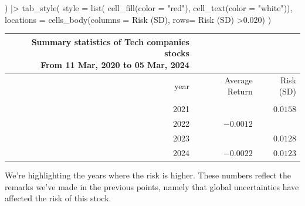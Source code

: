 \documentclass[
  12pt]{article}
\newenvironment{Shaded}{\begin{snugshade}}{\end{snugshade}}
\newcommand{\AttributeTok}[1]{\textcolor[rgb]{0.40,0.45,0.13}{#1}}
\newcommand{\FloatTok}[1]{\textcolor[rgb]{0.68,0.00,0.00}{#1}}
\newcommand{\FunctionTok}[1]{\textcolor[rgb]{0.28,0.35,0.67}{#1}}
\newcommand{\NormalTok}[1]{\textcolor[rgb]{0.00,0.23,0.31}{#1}}
\newcommand{\SpecialCharTok}[1]{\textcolor[rgb]{0.37,0.37,0.37}{#1}}
\newcommand{\StringTok}[1]{\textcolor[rgb]{0.13,0.47,0.30}{#1}}
\theoremstyle{definition}
\theoremstyle{remark}
\begin{document}
\begin{Shaded}
\begin{Highlighting}[]
\NormalTok{  ) }\SpecialCharTok{|\textgreater{}} 
  \FunctionTok{tab\_style}\NormalTok{(}
    \AttributeTok{style =} \FunctionTok{list}\NormalTok{(}
      \FunctionTok{cell\_fill}\NormalTok{(}\AttributeTok{color =} \StringTok{"red"}\NormalTok{), }
      \FunctionTok{cell\_text}\NormalTok{(}\AttributeTok{color =} \StringTok{"white"}\NormalTok{)), }
    \AttributeTok{locations =} 
      \FunctionTok{cells\_body}\NormalTok{(}\AttributeTok{columns =} \StringTok{\textasciigrave{}}\AttributeTok{Risk (SD)}\StringTok{\textasciigrave{}}\NormalTok{, }
                 \AttributeTok{rows=} \StringTok{\textasciigrave{}}\AttributeTok{Risk (SD)}\StringTok{\textasciigrave{}} \SpecialCharTok{\textgreater{}}\FloatTok{0.020}\NormalTok{)}
\NormalTok{  )}
\end{Highlighting}
\end{Shaded}

\begin{longtable*}{rrr}
\caption*{
{\large Summary statistics of Tech companies stocks} \\ 
{\small From 11 Mar, 2020 to 05 Mar, 2024}
} \\ 
\toprule
year & Average Return & Risk (SD) \\ 
\midrule{} &  &  \\ 
2021 &  & $0.0158$ \\ 
2022 & $-0.0012$ &  \\ 
2023 &  & $0.0128$ \\ 
2024 & $-0.0022$ & $0.0123$ \\ 
\bottomrule
\end{longtable*}

\begin{tcolorbox}[enhanced jigsaw, rightrule=.15mm, colbacktitle=quarto-callout-important-color!10!white, breakable, colback=white, titlerule=0mm, colframe=quarto-callout-important-color-frame, opacityback=0, bottomrule=.15mm, opacitybacktitle=0.6, left=2mm, title=\textcolor{quarto-callout-important-color}{\faExclamation}\hspace{0.5em}{Look at the years (again)!}, bottomtitle=1mm, coltitle=black, toptitle=1mm, arc=.35mm, toprule=.15mm, leftrule=.75mm]

We're highlighting the years where the risk is higher. These numbers
reflect the remarks we've made in the previous points, namely that
global uncertainties have affected the risk of this stock.

\end{tcolorbox}
\end{document}
